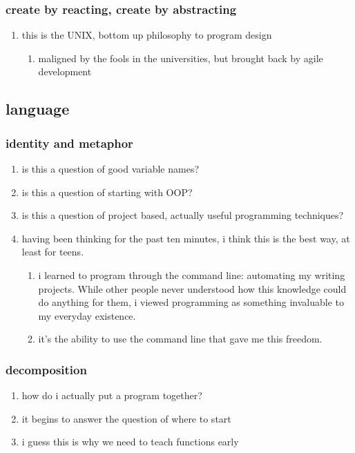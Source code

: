 \documentclass{article}
\begin{document}
	\subsubsection{create by reacting, create by abstracting}
	\begin{enumerate}
		\item this is the UNIX, bottom up philosophy to program design
		\begin{enumerate}
			\item maligned by the fools in the universities, but brought back by agile development
		\end{enumerate}
	\end{enumerate}
	\subsection{language}
	\subsubsection{identity and metaphor}
	\begin{enumerate}
		\item is this a question of good variable names?
		\item is this a question of starting with OOP?
		\item is this a question of project based, actually useful programming techniques?
		\item having been thinking for the past ten minutes, i think this is the best way, at least for teens.
		\begin{enumerate}
			\item i learned to program through the command line: automating my writing projects. While other people never understood how this knowledge could do anything for them, i viewed programming as something invaluable to my everyday existence.
			\item it's the ability to use the command line that gave me this freedom.
		\end{enumerate}
	\end{enumerate}
	\subsubsection{decomposition}
	\begin{enumerate}
		\item how do i actually put a program together?
		\item it begins to answer the question of where to start
		\item i guess this is why we need to teach functions early
	\end{enumerate}
\end{document}
